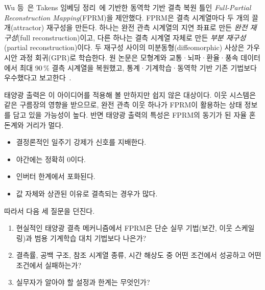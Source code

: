 \documentclass[11pt,a4paper]{article}
\newcommand{\pct}{\,\%}
\begin{document}
Wu 등~\cite{wu2026fprm}은 Takens 임베딩 정리~\cite{takens1981,deyle2011}에 기반한 동역학 기반 결측 복원 틀인 \emph{Full-Partial Reconstruction Mapping}(FPRM)을 제안했다.
FPRM은 결측 시계열마다 두 개의 끌개(attractor) 재구성을 만든다.
하나는 완전 관측 시계열의 지연 좌표로 만든 \emph{완전 재구성}(full reconstruction)이고, 다른 하나는 결측 시계열 자체로 만든 \emph{부분 재구성}(partial reconstruction)이다.
두 재구성 사이의 미분동형(diffeomorphic) 사상은 가우시안 과정 회귀(GPR)로 학습한다.
원 논문은 모형계와 교통·뇌파·환율·풍속 데이터에서 최대 90\pct{} 결측 시계열을 복원했고, 통계·기계학습·동역학 기반 기존 기법보다 우수했다고 보고한다~\cite{wu2026fprm}.

태양광 출력은 이 아이디어를 적용해 볼 만하지만 쉽지 않은 대상이다.
이웃 시스템은 같은 구름장의 영향을 받으므로, 완전 관측 이웃 하나가 FPRM이 활용하는 상태 정보를 담고 있을 가능성이 높다.
반면 태양광 출력의 특성은 FPRM의 동기가 된 자율 혼돈계와 거리가 멀다.
\begin{itemize}
  \item 결정론적인 일주기 강제가 신호를 지배한다.
  \item 야간에는 정확히 0이다.
  \item 인버터 한계에서 포화된다.
  \item 값 자체와 상관된 이유로 결측되는 경우가 많다.
\end{itemize}
따라서 다음 세 질문을 던진다.
\begin{enumerate}
  \item 현실적인 태양광 결측 메커니즘에서 FPRM은 단순 실무 기법(보간, 이웃 스케일링)과 범용 기계학습 대치 기법보다 나은가?
  \item 결측률, 공백 구조, 참조 시계열 종류, 시간 해상도 중 어떤 조건에서 성공하고 어떤 조건에서 실패하는가?
  \item 실무자가 알아야 할 설정과 한계는 무엇인가?
\end{enumerate}
\end{document}
